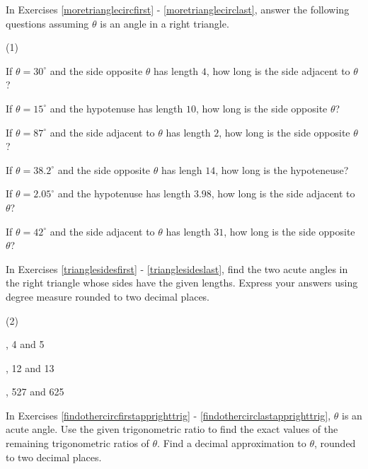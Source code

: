 In Exercises \ref{moretrianglecircfirst} - \ref{moretrianglecirclast}, answer the following questions assuming  $\theta$ is an angle in a right triangle.

\begin{tasks}[resume](1)

\task  If $\theta = 30^{\circ}$ and the side opposite $\theta$ has length $4$, how long is the side adjacent to $\theta$? \label{moretrianglecircfirst}

\task  If $\theta = 15^{\circ}$ and the hypotenuse has length $10$, how long is the side opposite $\theta$?

\task  If $\theta = 87^{\circ}$ and the side adjacent to $\theta$ has length $2$, how long is the side opposite $\theta$?

\task  If $\theta = 38.2^{\circ}$ and the side opposite $\theta$ has lengh $14$, how long is the hypoteneuse?

\task  If $\theta = 2.05^{\circ}$ and the hypotenuse has length $3.98$, how long is the side adjacent to $\theta$?

\task  If $\theta = 42^{\circ}$ and the side adjacent to $\theta$ has length $31$, how long is the side opposite $\theta$? \label{moretrianglecirclast}

\end{tasks}

In Exercises \ref{trianglesidesfirst} - \ref{trianglesideslast}, find the two acute angles in the right triangle whose sides have the given lengths.  Express your answers using degree measure rounded to two decimal places.

\begin{tasks}[resume](2)

, 4 and 5 \label{trianglesidesfirst}

, 12 and 13

, 527 and 625 \label{trianglesideslast}

\end{tasks}

In Exercises \ref{findothercircfirstapprighttrig} - \ref{findothercirclastapprighttrig}, $\theta$ is an acute angle.  Use the given trigonometric ratio to find the exact values of the remaining trigonometric ratios of $\theta$.  Find a decimal approximation to $\theta$, rounded to two decimal places.

